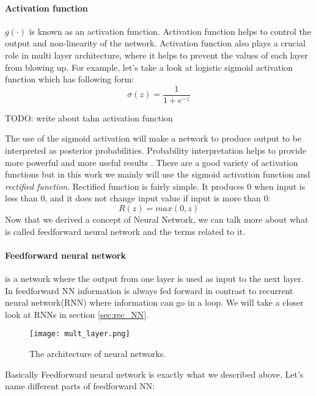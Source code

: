\paragraph{Activation function} $g(\cdot)$ is known as an activation function.
Activation function helps to control the output and non-linearity of the network.
Activation function also plays a crucial role in multi layer architecture, where it helps
to prevent the values of each layer from blowing up.
For example, let's take a look at logistic sigmoid activation function which has
following form:
\begin{equation} \label{sigmoid_function}
	\sigma(z) = \frac{1}{1 + e^{-z}}
\end{equation}

TODO: write about tahn activation function

The use of the sigmoid activation will make a network to produce output to be
interpreted as posterior probabilities. Probability interpretation helps to provide
more powerful and more useful results \cite{Bishop1995}. There are a good variety
of activation functions but in this work we mainly will use the sigmoid activation function
and \emph{rectified function}. Rectified function is fairly simple.
It produces $0$ when input is less than $0$, and it does not change input value if
input is more than 0:
\begin{equation} \label{eq:rect_function}
	R(z) = max(0, z)
\end{equation}
Now that we derived a concept of Neural Network, we can talk more about
what is called feedforward neural network and the terms related to it.
\paragraph{Feedforward neural network} is a network where the output
from one layer is used as input to the next layer. In feedforward NN
information is always fed forward in contrast to recurrent neural network(RNN)
where information can go in a loop. We will take a closer look at RNNs in section
\autoref{sec:rec_NN}.

\begin{figure}[H]
	\texttt{[image: mult\_layer.png]}
	\caption{The architecture of neural networks\cite{Nielsen2015}.} %
	\label{img:mult_layer} %
\end{figure}

Basically Feedforward neural network is exactly
what we described above. Let's name different parts of feedforward NN:

